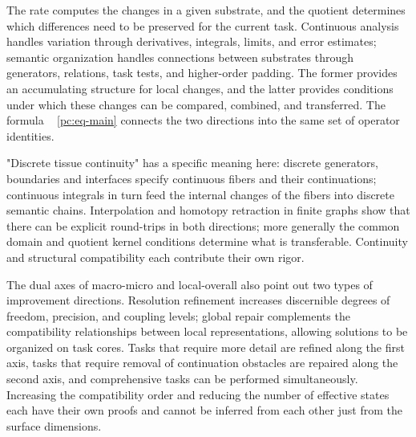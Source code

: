 \documentclass[11pt,a4paper]{article}
\theoremstyle{plain}
\theoremstyle{definition}
\theoremstyle{remark}
\begin{document}
\begin{CJK*}
The rate computes the changes in a given substrate, and the quotient determines which differences need to be preserved for the current task. Continuous analysis handles variation through derivatives, integrals, limits, and error estimates; semantic organization handles connections between substrates through generators, relations, task tests, and higher-order padding. The former provides an accumulating structure for local changes, and the latter provides conditions under which these changes can be compared, combined, and transferred. The formula ~ \eqref{pc:eq-main} connects the two directions into the same set of operator identities.

"Discrete tissue continuity" has a specific meaning here: discrete generators, boundaries and interfaces specify continuous fibers and their continuations; continuous integrals in turn feed the internal changes of the fibers into discrete semantic chains. Interpolation and homotopy retraction in finite graphs show that there can be explicit round-trips in both directions; more generally the common domain and quotient kernel conditions determine what is transferable. Continuity and structural compatibility each contribute their own rigor.

The dual axes of macro-micro and local-overall also point out two types of improvement directions. Resolution refinement increases discernible degrees of freedom, precision, and coupling levels; global repair complements the compatibility relationships between local representations, allowing solutions to be organized on task cores. Tasks that require more detail are refined along the first axis, tasks that require removal of continuation obstacles are repaired along the second axis, and comprehensive tasks can be performed simultaneously. Increasing the compatibility order and reducing the number of effective states each have their own proofs and cannot be inferred from each other just from the surface dimensions.


\end{CJK*}
\end{document}
